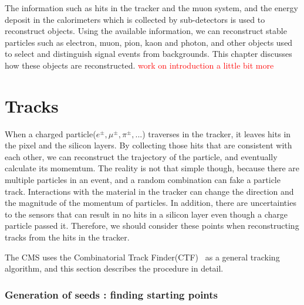
The information such as hits in the tracker and the muon system,
and the energy deposit in the calorimeters which is collected by 
sub-detectors is used to reconstruct objects. Using the available 
information, we can reconstruct stable particles such as 
electron, muon, pion, kaon and photon, and other objects 
used to select and distinguish signal events from backgrounds. 
This chapter discusses how these objects are reconstructed. 
\textcolor{red}{work on introduction a little bit more} 

\section{ Tracks }
\label{sec:track}

When a charged particle($e^\pm, \mu^\pm, \pi^\pm, ... $) traverses in the tracker,
it leaves hits in the pixel and the silicon layers. By collecting those hits
that are consistent with each other, we can reconstruct the 
trajectory of the particle, and eventually calculate its momemtum. 
The reality is not that simple though, because there are multiple 
particles in an event, and a random combination can fake a particle track.  
Interactions with the material in the tracker can change the 
direction and the magnitude of the momentum of particles. 
In addition, there are uncertainties to the sensors that 
can result in no hits in a silicon layer even though a charge 
particle passed it. Therefore, we should consider these points 
when reconstructing tracks from the hits in the tracker. 

The CMS uses the Combinatorial Track Finder(CTF)~\cite{} as a general tracking 
algorithm, and this section describes the procedure in detail.


\subsubsection{Generation of seeds : finding starting points}

